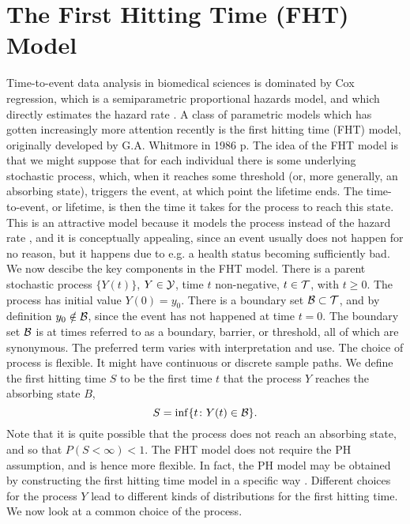 \section{The First Hitting Time (FHT) Model}\label{sec:fht}
Time-to-event data analysis in biomedical sciences is dominated by Cox regression, which is a semiparametric proportional hazards model, and which directly estimates the hazard rate \citep{stogiannis-2013}. A class of parametric models which has gotten increasingly more attention recently is the first hitting time (FHT) model, originally developed by G.A. Whitmore in 1986 p\cite{whitmore1986,leewhitmore2006}. The idea of the FHT model is that we might suppose that for each individual there is some underlying stochastic process, which, when it reaches some threshold (or, more generally, an absorbing state), triggers the event, at which point the lifetime ends. The time-to-event, or lifetime, is then the time it takes for the process to reach this state. This is an attractive model because it models the process instead of the hazard rate \citep{aalengjessing2001}, and it is conceptually appealing, since an event usually does not happen for no reason, but it happens due to e.g. a health status becoming sufficiently bad. We now descibe the key components in the FHT model. There is a parent stochastic process $\{Y(t)\}$, $Y\in\mathcal{Y}$, time $t$ non-negative, $t\in\mathcal{T}$, with $t\geq0$. The process has initial value $Y(0)=y_0$. There is a boundary set $\mathcal{B}\subset\mathcal{T}$, and by definition $y_0\notin\mathcal{B}$, since the event has not happened at time $t=0$. The boundary set $\mathcal{B}$ is at times referred to as a boundary, barrier, or threshold, all of which are synonymous. The preferred term varies with interpretation and use.
The choice of process is flexible. It might have continuous or discrete sample paths. We define the first hitting time $S$ to be the first time $t$ that the process $Y$ reaches the absorbing state $B$,
\begin{equation}
    S=\inf\{t\colon Y(t)\in\mathcal{B}\}.
\end{equation}
Note that it is quite possible that the process does not reach an absorbing state, and so that $P(S<\infty)<1$. The FHT model does not require the PH assumption, and is hence more flexible. In fact, the PH model may be obtained by constructing the first hitting time model in a specific way \citep{lee2010}. Different choices for the process $Y$ lead to different kinds of distributions for the first hitting time. We now look at a common choice of the process.

